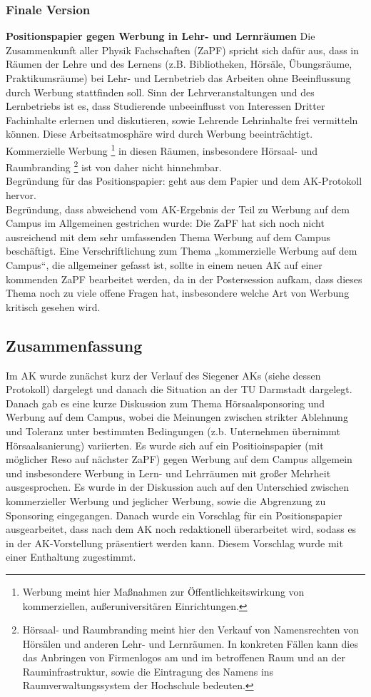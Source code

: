		\subsubsection{Finale Version}
			\textbf{Positionspapier gegen Werbung in Lehr- und Lernräumen}
				Die Zusammenkunft aller Physik Fachschaften (ZaPF) spricht sich dafür aus, dass in Räumen der Lehre und des Lernens (z.B. Bibliotheken, Hörsäle, Übungsräume, Praktikumsräume) bei Lehr- und Lernbetrieb das Arbeiten ohne Beeinflussung durch Werbung stattfinden soll. Sinn der Lehrveranstaltungen und des Lernbetriebs ist es, dass Studierende unbeeinflusst von Interessen Dritter Fachinhalte erlernen und diskutieren, sowie Lehrende Lehrinhalte frei vermitteln können. Diese Arbeitsatmosphäre wird durch Werbung beeinträchtigt.
				Kommerzielle Werbung \footnote{Werbung meint hier Maßnahmen zur Öffentlichkeitswirkung von kommerziellen, außeruniversitären Einrichtungen.} in diesen Räumen, insbesondere Hörsaal- und Raumbranding \footnote{Hörsaal- und Raumbranding meint hier den Verkauf von Namensrechten von Hörsälen und anderen Lehr- und Lernräumen. In konkreten Fällen kann dies das Anbringen von Firmenlogos am und im betroffenen Raum und an der Rauminfrastruktur, sowie die Eintragung des Namens ins Raumverwaltungssystem der Hochschule bedeuten.} ist von daher nicht hinnehmbar. \\

				Begründung für das Positionspapier:
				geht aus dem Papier und dem AK-Protokoll hervor. \\

				Begründung, dass abweichend vom AK-Ergebnis der  Teil zu  Werbung auf dem Campus im Allgemeinen gestrichen wurde:
				Die ZaPF hat sich noch nicht ausreichend mit dem sehr umfassenden Thema Werbung auf dem Campus beschäftigt. Eine Verschriftlichung zum Thema „kommerzielle Werbung auf dem Campus“, die allgemeiner gefasst ist, sollte in einem neuen AK auf einer kommenden ZaPF bearbeitet werden, da in der Postersession aufkam, dass dieses Thema noch zu viele offene Fragen hat, insbesondere welche Art von Werbung kritisch gesehen wird.

	\subsection*{Zusammenfassung}
		Im AK wurde zunächst kurz der Verlauf des Siegener AKs (siehe dessen Protokoll) dargelegt und danach die Situation an der TU Darmstadt dargelegt. Danach gab es eine kurze Diskussion zum Thema Hörsaalsponsoring und Werbung auf dem Campus, wobei die Meinungen zwischen strikter Ablehnung und Toleranz unter bestimmten Bedingungen (z.b. Unternehmen übernimmt Hörsaalsanierung) variierten. Es wurde sich auf ein Positioinspapier (mit möglicher Reso auf nächster ZaPF) gegen Werbung auf dem Campus allgemein und insbesondere Werbung in Lern- und Lehrräumen mit großer Mehrheit ausgesprochen. Es wurde in der Diskussion auch auf den Unterschied zwischen kommerzieller Werbung und jeglicher Werbung, sowie die Abgrenzung zu Sponsoring eingegangen. Danach wurde ein Vorschlag für ein Positionspapier ausgearbeitet, dass nach dem AK noch redaktionell überarbeitet wird, sodass es in der AK-Vorstellung präsentiert werden kann. Diesem Vorschlag wurde mit einer Enthaltung zugestimmt.
